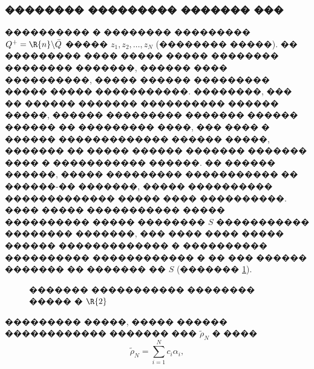 \documentclass[a4paper]{article}
\begin{document}
\subsubsection{�������� ��������� ������� ���}
���������� � �������� ��������� $Q^+= \R{n}\backslash \bar Q$ ����� $z_1,z_2,\dots,z_N$ (�������� �����). �� ��������� ���� ����� ����� �������� �������� �������, ������ ���� ����������, ����� ������ ��������� ����� ����� �����������.
��������, ��� �� ������ ������� ���������� ������ �����, ������ ��������� ������� ������ ������ �� ��������� ����, ��� ���� � ������ ������������� ������ �����, ������� �� ����� ������ ������� ������� ���� � ����������� ������.
�� ������ ������, ����� ��������� ����������� �� ������-�� �������, ����� ���������� ������������� ����� ���� ����������.
���� ����� ����������� ����� ���������� ����� �������� $S$ ����������� �������� �������, ��� ���� ���� ����� ������ ������������� � ���������� ���������� ������������ � �� ��� ������ ������� �� ������� �� $S$ (������� \ref{sample}).

\begin{figure}[!h]
  \noindent{}
  \caption{������� ����������� �������� ����� � $\R{2}$}
  \label{sample}
\end{figure}


��������� �����, ����� ������ ������������ ������� ��� $\tilde \rho_N$ � ����
\begin{equation}
  \tilde \rho_N=\sum_{i=1}^N c_i \alpha_i,
\end{equation}
\end{document}
